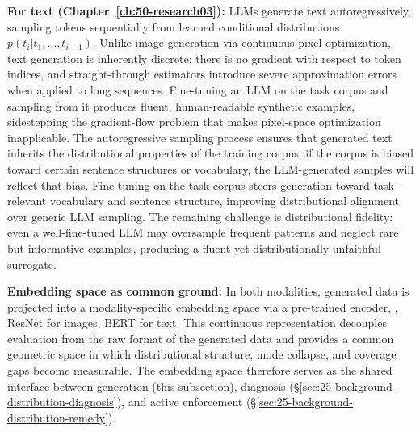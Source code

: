 \begin{foldable}
  \textbf{For text (Chapter~\ref{ch:50-research03}):}
  \Acp{LLM} generate text autoregressively, sampling tokens sequentially from learned conditional distributions $p(t_i | t_1, \ldots, t_{i-1})$.
  Unlike image generation via continuous pixel optimization, text generation is inherently discrete: there is no gradient with respect to token indices, and straight-through estimators introduce severe approximation errors when applied to long sequences.
  Fine-tuning an \ac{LLM} on the task corpus and sampling from it produces fluent, human-readable synthetic examples, sidestepping the gradient-flow problem that makes pixel-space optimization inapplicable.
  The autoregressive sampling process ensures that generated text inherits the distributional properties of the training corpus: if the corpus is biased toward certain sentence structures or vocabulary, the \ac{LLM}-generated samples will reflect that bias.
  Fine-tuning on the task corpus steers generation toward task-relevant vocabulary and sentence structure, improving distributional alignment over generic \ac{LLM} sampling.
  The remaining challenge is distributional fidelity: even a well-fine-tuned \ac{LLM} may oversample frequent patterns and neglect rare but informative examples, producing a fluent yet distributionally unfaithful surrogate.
\end{foldable}

\begin{foldable}
  \textbf{Embedding space as common ground:}
  In both modalities, generated data is projected into a modality-specific embedding space via a pre-trained encoder, \eg, ResNet for images, BERT for text.
  This continuous representation decouples evaluation from the raw format of the generated data and provides a common geometric space in which distributional structure, mode collapse, and coverage gaps become measurable.
  The embedding space therefore serves as the shared interface between generation (this subsection), diagnosis (\S\ref{sec:25-background-distribution-diagnosis}), and active enforcement (\S\ref{sec:25-background-distribution-remedy}).
\end{foldable}

